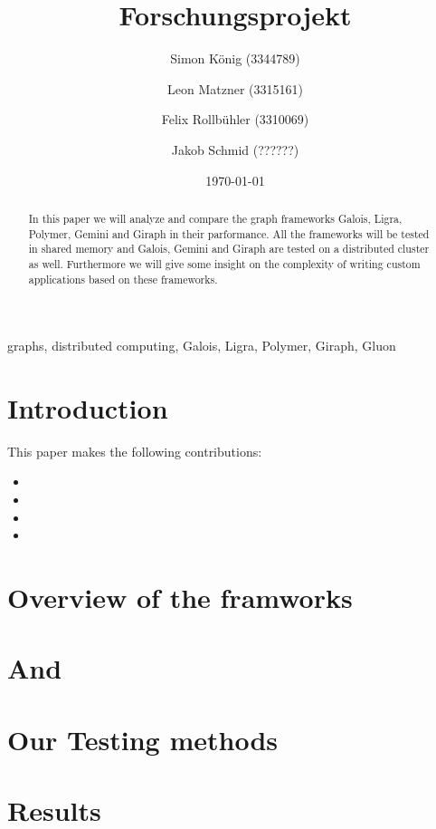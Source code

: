 \documentclass[conference,a4paper]{IEEEtran}
\title{Forschungsprojekt}
\author{Simon König (3344789) \and Leon Matzner (3315161) \and Felix Rollbühler (3310069) \and Jakob Schmid (??????)}
\date{\today}
\newcommand{\todo}{{\color{red}TODO}}
\begin{document}
\maketitle


\begin{abstract}
In this paper we will analyze and compare the graph frameworks Galois, Ligra, Polymer, Gemini and Giraph in their parformance. All the frameworks will be tested in shared memory and Galois, Gemini and Giraph are tested on a distributed cluster as well.
Furthermore we will give some insight on the complexity of writing custom applications based on these frameworks.
\end{abstract}

\begin{IEEEkeywords}
graphs, distributed computing, Galois, Ligra, Polymer, Giraph, Gluon
\end{IEEEkeywords}



\section{Introduction}

This paper makes the following contributions:
\begin{itemize}
  \item
  \item
  \item
  \item
\end{itemize}

\section{Overview of the framworks}






\section{And}

\section{Our Testing methods}


\section{Results}
\end{document}
